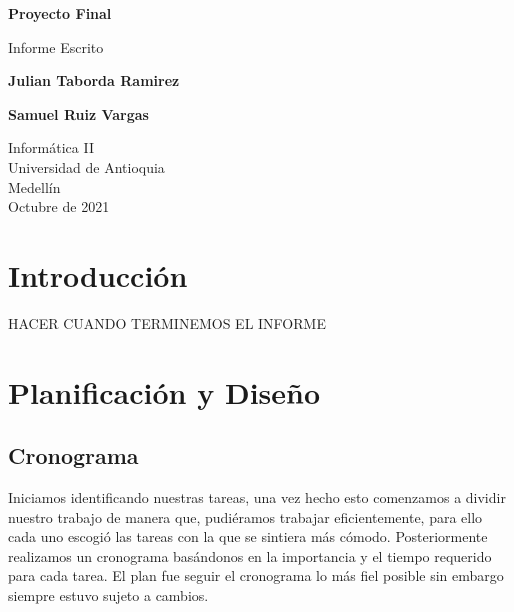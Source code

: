 \documentclass{article}
\begin{document}
\begin{titlepage}
    \begin{center}
        \vspace*{1cm}
            
        \Huge
        \textbf{Proyecto Final}
            
        \vspace{0.5cm}
        \LARGE
        Informe Escrito
            
        \vspace{1.5cm}
            
        \textbf{Julian Taborda Ramirez}
        
        \vspace{0.5cm}
        
        \textbf{Samuel Ruiz Vargas}
            
        \vfill
            
        \vspace{0.8cm}
            
        \Large
        Informática II\\
        Universidad de Antioquia\\
        Medellín\\
        Octubre de 2021
            
    \end{center}
\end{titlepage}

\tableofcontents
\vspace*{1.2cm}

\newpage

\section{Introducción}
    HACER CUANDO TERMINEMOS EL INFORME 

\section{Planificación y Diseño}
    \subsection{Cronograma}
        Iniciamos identificando nuestras tareas, una vez hecho esto comenzamos a dividir nuestro trabajo de manera que, pudiéramos trabajar eficientemente, para ello cada uno escogió las tareas con la que se sintiera más cómodo. Posteriormente realizamos un cronograma basándonos en la importancia y el tiempo requerido para cada tarea. El plan fue seguir el cronograma lo más fiel posible sin embargo siempre estuvo sujeto a cambios. 
        
\end{document}
